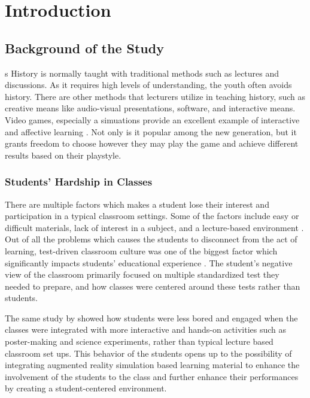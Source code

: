 %
%
%                 

\chapter{Introduction}
\label{sec:intro}   
\section{Background of the Study}
\label{sec:overview}
s
History is normally taught with traditional methods such as lectures and discussions. As it requires high levels of understanding, the youth often avoids history. There are other methods that lecturers utilize in teaching history, such as creative means like audio-visual presentations, software, and interactive means. Video games, especially a simuations provide an excellent example of interactive and affective learning \cite{ARVRRome}. Not only is it popular among the new generation, but it grants freedom to choose however they may play the game and achieve different results based on their playstyle.
 
\subsection{Students' Hardship in Classes}
There are multiple factors which makes a student lose their interest and participation in a typical classroom settings. Some of the factors include easy or difficult materials, lack of interest in a subject, and a lecture-based environment \cite{medium:mosley}. Out of all the problems which causes the students to disconnect from the act of learning, test-driven classroom culture was one of the biggest factor which significantly impacts students' educational experience \cite{mora}. The student's negative view of the classroom primarily focused on multiple standardized test they needed to prepare, and how classes were centered around these tests rather than students.

The same study by \cite{mora} showed how students were less bored and engaged when the classes were integrated with more interactive and hands-on activities such as poster-making and science experiments, rather than typical lecture based classroom set ups. This behavior of the students opens up to the possibility of integrating augmented reality simulation based learning material to enhance the involvement of the students to the class and further enhance their performances by creating a student-centered environment.


